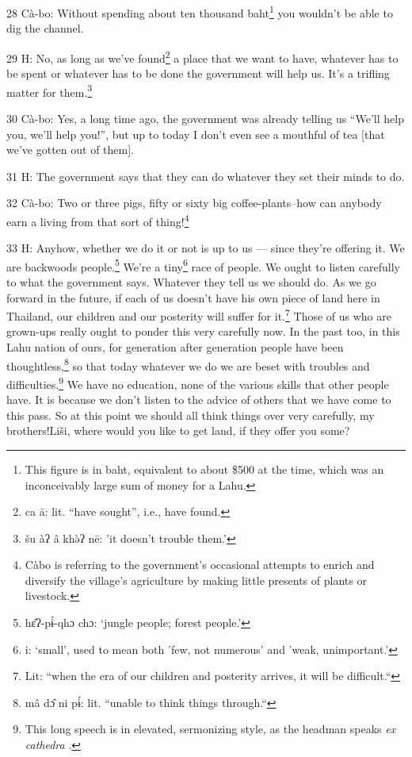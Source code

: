 28 Cà-bo: Without spending about ten thousand baht\footnote{This figure is in baht, equivalent to about \$500 at the time, which was an inconceivably large sum of money for a Lahu.} you wouldn't be able to
dig the channel.

29 H: No, as long as we've found\footnote{ca ā: lit. ``have sought'', i.e., have found.} a place that we want to have, whatever has
to be spent or whatever has to be done the government will help us. It's a trifling
matter for them.\footnote{šu àʔ â khə̀ʔ nē: 'it doesn't trouble them.'}

30 Cà-bo: Yes, a long time ago, the government was already telling us ``We'll
help you, we'll help you!'', but up to today I don't even see a mouthful of tea
[that we've gotten out of them].

31 H: The government says that they can do whatever they set their minds to do.

32 Cà-bo: Two or three pigs, fifty or sixty big coffee-plants--how can anybody
earn a living from that sort of thing!\footnote{Càbo is referring to the government's occasional attempts to enrich and diversify the village's agriculture by making little presents of plants or livestock.}

33 H: Anyhow, whether we do it or not is up to us --- since they're offering it.
We are backwoods people.\footnote{hɛ̂ʔ-pɨ́-qhɔ chɔ: `jungle people; forest people.'} We're a tiny\footnote{i: `small', used to mean both 'few, not numerous' and 'weak, unimportant.'} race of people. We ought to listen
carefully to what the government says. Whatever they tell us we should do. As we
go forward in the future, if each of us doesn't have his own piece of land here
in Thailand, our children and our posterity will suffer for it.\footnote{Lit: ``when the era of our children and posterity arrives, it will be difficult.``} Those of us
who are grown-ups really ought to ponder this very carefully now. In the past too,
in this Lahu nation of ours, for generation after generation people have been thoughtless,\footnote{mâ dɔ̂ ni pɨ́: lit. ``unable to think things through.``}
so that today whatever we do we are beset with troubles and difficulties.\footnote{This long speech is in elevated, sermonizing style, as the headman speaks \textit{ex cathedra }.} We
have no education, none of the various skills that other people have. It is because
we don't listen to the advice of others that we have come to this pass. So at this
point we should all think things over very carefully, my brothers!Liši, where
would you like to get land, if they offer you some?

